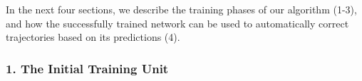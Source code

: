 \documentclass[9pt,lineno]{elife}
\newcommand{\idtracker}{\protect\path{ idtracker.ai}}
\begin{document}

In the next four sections, we describe the training phases of our algorithm (1-3), and how the successfully trained network can be used to automatically correct trajectories based on its predictions (4).





\subsubsection{1. The Initial Training Unit}
\end{document}
